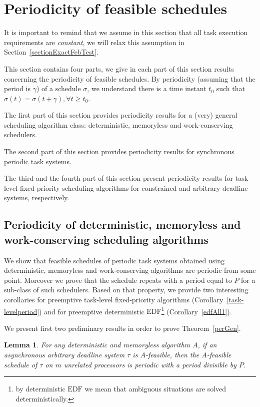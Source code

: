 \documentclass[a4paper,11pt]{article}
\newcommand{\EDF}{\textrm{EDF}}
\newtheorem{Lemma}[Theorem]{Lemma}
\begin{document}
\section{Periodicity of feasible schedules}\label{sectionMainPer}

It is important to remind that we assume in this section that all task execution requirements are \emph{constant}, we will relax this assumption in Section~\ref{sectionExactFebTest}. 

This section contains four parts,  we give in each part of this section results concerning the periodicity of feasible schedules. By periodicity (assuming that the period is $\gamma$) of a schedule $\sigma$, we understand there is a time instant $t_{0}$ such that $\sigma(t)=\sigma(t+\gamma), \forall t \geq t_{0}$.

The first part of this section provides periodicity results for a
(very) general scheduling algorithm class: deterministic,
memoryless and work-conserving schedulers. 

The second part of this section provides periodicity results for
synchronous periodic task systems.

The third and the fourth part of this section present periodicity
results for task-level fixed-priority scheduling algorithms for constrained and arbitrary deadline systems, respectively. 

\subsection{Periodicity of deterministic, memoryless and
  work-conserving scheduling algorithms} \label{genGenSyst}

We show that feasible schedules of periodic task systems obtained
using deterministic, memoryless and work-conserving algorithms are
periodic from some point. Moreover we prove that the schedule repeats
with a period equal to $P$ for a sub-class of such schedulers. Based on that property, we provide two
interesting corollaries for preemptive task-level fixed-priority algorithms (Corollary~\ref{task-levelperiod}) and for preemptive deterministic $\EDF$\footnote{by deterministic {$\EDF$} we mean that ambiguous situations are solved deterministically.} (Corollary~\ref{edfAll1}).

We present first two preliminary results in order to prove Theorem~\ref{perGen}.
 
\begin{Lemma}\label{thZero} For any deterministic and memoryless
  algorithm $A$, if an asynchronous arbitrary deadline system $\tau$
  is $A$-feasible, then the $A$-feasible schedule of $\tau$ on $m$
  unrelated processors is periodic with a period \emph{divisible} by
  $P$. 
\end{Lemma}
\end{document}
